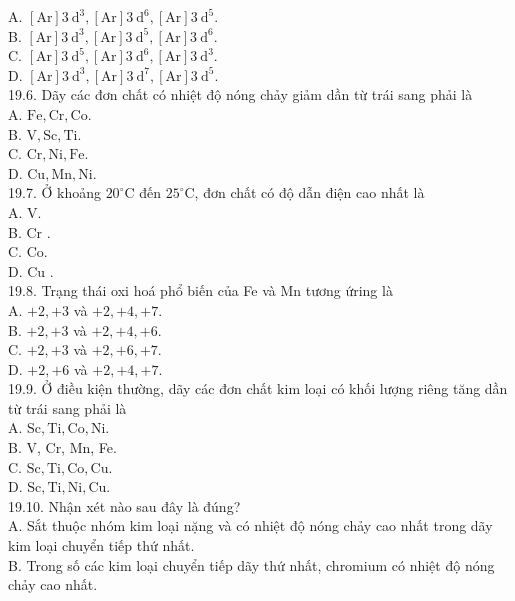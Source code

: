 \documentclass[10pt]{article}
\begin{document}
A. $[\mathrm{Ar}] 3 \mathrm{~d}^{3},[\mathrm{Ar}] 3 \mathrm{~d}^{6},[\mathrm{Ar}] 3 \mathrm{~d}^{5}$.\\
B. $[\mathrm{Ar}] 3 \mathrm{~d}^{3},[\mathrm{Ar}] 3 \mathrm{~d}^{5},[\mathrm{Ar}] 3 \mathrm{~d}^{6}$.\\
C. $[\mathrm{Ar}] 3 \mathrm{~d}^{5},[\mathrm{Ar}] 3 \mathrm{~d}^{6},[\mathrm{Ar}] 3 \mathrm{~d}^{3}$.\\
D. $[\mathrm{Ar}] 3 \mathrm{~d}^{3},[\mathrm{Ar}] 3 \mathrm{~d}^{7},[\mathrm{Ar}] 3 \mathrm{~d}^{5}$.\\
19.6. Dãy các đơn chất có nhiệt độ nóng chảy giảm dần từ trái sang phải là\\
A. $\mathrm{Fe}, \mathrm{Cr}, \mathrm{Co}$.\\
B. $\mathrm{V}, \mathrm{Sc}, \mathrm{Ti}$.\\
C. $\mathrm{Cr}, \mathrm{Ni}, \mathrm{Fe}$.\\
D. $\mathrm{Cu}, \mathrm{Mn}, \mathrm{Ni}$.\\
19.7. Ở khoảng $20^{\circ} \mathrm{C}$ đến $25^{\circ} \mathrm{C}$, đơn chất có độ dẫn điện cao nhất là\\
A. V.\\
B. Cr .\\
C. Co.\\
D. Cu .\\
19.8. Trạng thái oxi hoá phổ biến của Fe và Mn tương ứring là\\
A. $+2,+3$ và $+2,+4,+7$.\\
B. $+2,+3$ và $+2,+4,+6$.\\
C. $+2,+3$ và $+2,+6,+7$.\\
D. $+2,+6$ và $+2,+4,+7$.\\
19.9. Ở điều kiện thường, dãy các đơn chất kim loại có khối lượng riêng tăng dần từ trái sang phải là\\
A. $\mathrm{Sc}, \mathrm{Ti}, \mathrm{Co}, \mathrm{Ni}$.\\
B. V, Cr, Mn, Fe.\\
C. $\mathrm{Sc}, \mathrm{Ti}, \mathrm{Co}, \mathrm{Cu}$.\\
D. $\mathrm{Sc}, \mathrm{Ti}, \mathrm{Ni}, \mathrm{Cu}$.\\
19.10. Nhận xét nào sau đây là đúng?\\
A. Sắt thuộc nhóm kim loại nặng và có nhiệt độ nóng chảy cao nhất trong dãy kim loại chuyển tiếp thứ nhất.\\
B. Trong số các kim loại chuyển tiếp dãy thứ nhất, chromium có nhiệt độ nóng chảy cao nhất.\\
\end{document}
